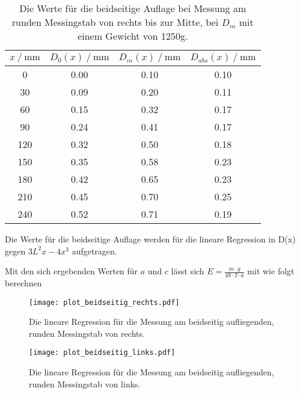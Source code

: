 \begin{table}[H]
  \centering
  \caption{Die Werte für die beidseitige Auflage bei Messung am runden Messingstab von rechts bis zur Mitte, bei $D_m$ mit 
  einem Gewicht von 1250g.}
  \begin{tabular}{cccc}
    \toprule
    {$x \mathbin{/} \unit{\milli\metre}$} &
    {$D_0(x) \mathbin{/} \unit{\milli\metre}$} &
    {$D_m(x) \mathbin{/} \unit{\milli\metre}$} &
    {$D_{abs}(x) \mathbin{/} \unit{\milli\metre}$} \\
    \midrule
      0 & 0.00 & 0.10 & 0.10 \\
     30 & 0.09 & 0.20 & 0.11 \\  
     60 & 0.15 & 0.32 & 0.17 \\
     90 & 0.24 & 0.41 & 0.17 \\
    120 & 0.32 & 0.50 & 0.18 \\
    150 & 0.35 & 0.58 & 0.23 \\
    180 & 0.42 & 0.65 & 0.23 \\
    210 & 0.45 & 0.70 & 0.25 \\
    240 & 0.52 & 0.71 & 0.19 \\
    \bottomrule
  \end{tabular}
  \label{tab:Tabelle6}
\end{table}


Die Werte für die beidseitige Auflage werden für die lineare Regression in D(x) gegen $3L^2 x - 4x^3$ aufgetragen.

Mit den sich ergebenden Werten für $a$ und $c$ lässt sich $E = \frac{m \cdot g}{48 \cdot I \cdot a}$ mit wie folgt berechnen



\begin{figure}
  \centering
  \texttt{[image: plot\_beidseitig\_rechts.pdf]}
  \caption{Die lineare Regression für die Messung am beidseitig aufliegenden, runden Messingstab von rechts.}
  \label{fig:plot_beidseitig_rechts}
\end{figure} 

\begin{figure}
  \centering
  \texttt{[image: plot\_beidseitig\_links.pdf]}
  \caption{Die lineare Regression für die Messung am beidseitig aufliegenden, runden Messingstab von links.}
  \label{fig:plot_beidseitig_links}
\end{figure}      


